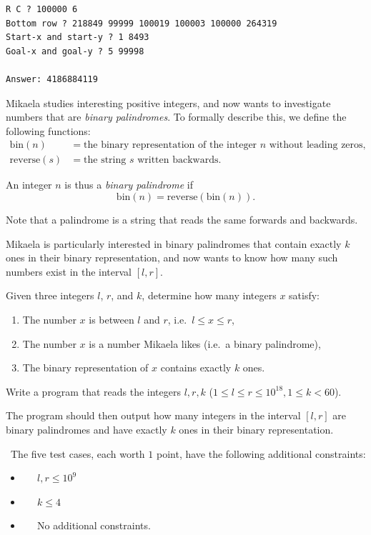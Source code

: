 \vspace{1cm}

\begin{verbatim}
R C ? 100000 6
Bottom row ? 218849 99999 100019 100003 100000 264319
Start-x and start-y ? 1 8493
Goal-x and goal-y ? 5 99998

Answer: 4186884119
\end{verbatim}




\newpage
{}

Mikaela studies interesting positive integers, and now wants to investigate numbers that are \emph{binary palindromes}.
To formally describe this, we define the following functions:
\begin{align*}
\text{bin}(n) &= \text{the binary representation of the integer } n \text{ without leading zeros},\\
\text{reverse}(s) &= \text{the string } s \text{ written backwards}.
\end{align*}

An integer $n$ is thus a \emph{binary palindrome} if
\[
\text{bin}(n) = \text{reverse}(\text{bin}(n)).
\]

Note that a palindrome is a string that reads the same forwards and backwards.

Mikaela is particularly interested in binary palindromes that contain exactly $k$ ones in their binary representation,
and now wants to know how many such numbers exist in the interval $[l,r]$.

Given three integers $l$, $r$, and $k$, determine how many integers $x$ satisfy:
\begin{enumerate}
\item The number $x$ is between $l$ and $r$, i.e.\ $l \leq x \leq r$,
\item The number $x$ is a number Mikaela likes (i.e.\ a binary palindrome),
\item The binary representation of $x$ contains exactly $k$ ones.
\end{enumerate}

Write a program that reads the integers $l, r, k$ ($1 \leq l \leq r \leq 10^{18}, 1 \leq k < 60$).

The program should then output how many integers in the interval $[l, r]$ are binary palindromes and have exactly $k$ ones in their binary representation.

\
The five test cases, each worth $1$ point, have the following additional constraints:
\begin{itemize}
\item[(1)] $\;\;\;\;$ $l,r \leq 10^9$
\item[(2)] $\;\;\;\;$ $k \leq 4$
\item[(3-5)] $\;\;\;\;$ No additional constraints.
\end{itemize}


